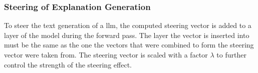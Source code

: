 \subsubsection{Steering of Explanation Generation}%
\label{sec:approach:steering:activation:steering}
To steer the text generation of a \acl{llm}, the computed steering vector is added to a layer of the model during the forward pass. The layer the vector is inserted into must be the same as the one the vectors that were combined to form the steering vector were taken from. The steering vector is scaled with a factor \(\lambda\) to further control the strength of the steering effect.
